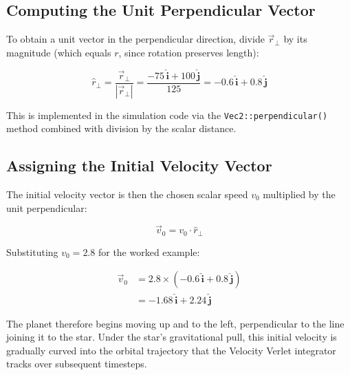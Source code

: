 \subsection{Computing the Unit Perpendicular Vector}

To obtain a unit vector in the perpendicular direction, divide $\vec{r}_\perp$ by its magnitude (which equals $r$, since rotation preserves length):

\begin{equation}
\hat{r}_\perp = \frac{\vec{r}_\perp}{|\vec{r}_\perp|} = \frac{-75\,\hat{\mathbf{i}} + 100\,\hat{\mathbf{j}}}{125} = -0.6\,\hat{\mathbf{i}} + 0.8\,\hat{\mathbf{j}}
\end{equation}

This is implemented in the simulation code via the \texttt{Vec2::perpendicular()} method combined with division by the scalar distance.

\subsection{Assigning the Initial Velocity Vector}

The initial velocity vector is then the chosen scalar speed $v_0$ multiplied by the unit perpendicular:

\begin{equation}
\vec{v}_0 = v_0 \cdot \hat{r}_\perp
\end{equation}

Substituting $v_0 = 2.8$ for the worked example:

\begin{align}
\vec{v}_0 &= 2.8 \times \left(-0.6\,\hat{\mathbf{i}} + 0.8\,\hat{\mathbf{j}}\right) \\
          &= -1.68\,\hat{\mathbf{i}} + 2.24\,\hat{\mathbf{j}}
\end{align}

The planet therefore begins moving up and to the left, perpendicular to the line joining it to the star. Under the star's gravitational pull, this initial velocity is gradually curved into the orbital trajectory that the Velocity Verlet integrator tracks over subsequent timesteps.